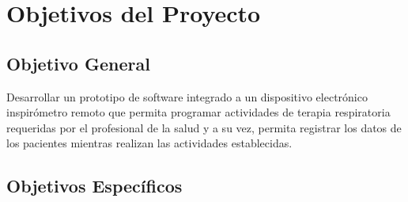 \documentclass[12pt]{article}
\begin{document}





\newpage




\newpage


\newpage



\section{Objetivos del Proyecto}

\subsection*{Objetivo General}

Desarrollar un prototipo de software integrado a un dispositivo electr\'onico inspir\'ometro remoto que permita programar actividades de terapia respiratoria requeridas por el profesional de la salud y a su vez, permita registrar los datos de los pacientes mientras realizan las actividades establecidas.

\subsection{Objetivos Específicos}
\label{objetivoses}
\end{document}
